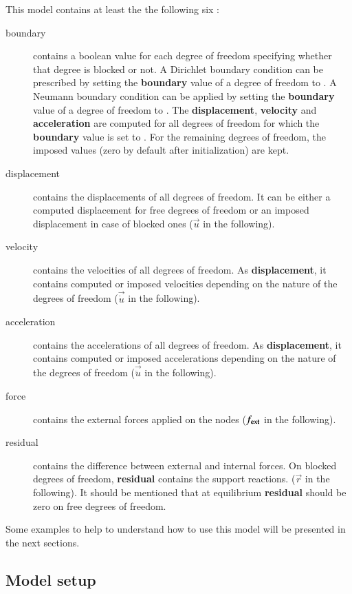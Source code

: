 This model contains at least the the following six :
\begin{description}
\item[boundary]  contains a  boolean  value for  each  degree of  freedom
  specifying  whether  that degree  is  blocked  or  not. A  Dirichlet  boundary
  condition can be prescribed by setting the \textbf{boundary} value of a degree
  of freedom to  .
  A Neumann boundary condition can be applied by setting the \textbf{boundary} value of a degree of freedom to .
  The \textbf{displacement},     \textbf{velocity} and     \textbf{acceleration} are computed for all degrees of freedom for which the \textbf{boundary} value is set to . For the remaining degrees of freedom, the imposed values (zero by default after initialization) are kept.
\item[displacement] contains the displacements of all degrees of freedom. It can
  be either  a computed displacement for  free degrees of freedom  or an imposed
  displacement in case of blocked ones ($\vec{u}$ in the following).
\item[velocity]  contains  the  velocities   of  all  degrees  of  freedom.   As
  \textbf{displacement}, it contains computed or imposed velocities depending on
  the nature of the degrees of freedom ($\vec{\dot{u}}$ in the following).
\item[acceleration]  contains the accelerations  of all  degrees of  freedom. As
  \textbf{displacement}, it contains computed or imposed accelerations depending
  on the nature of the degrees of freedom ($\vec{\ddot{u}}$ in the following).
\item[force]   contains    the   external   forces   applied    on   the   nodes
  ($\boldsymbol{f_{{\mathrm{ext}}}}$ in the following).
\item[residual] contains the difference between external and internal forces. On
  blocked degrees of freedom,  \textbf{residual} contains the support reactions.
  ($\vec{r}$  in the  following).  It  should be  mentioned that  at equilibrium
  \textbf{residual} should be zero on free degrees of freedom.
\end{description}

Some examples to help to understand  how to use this model will be presented
in the next sections.

\subsection{Model setup}

